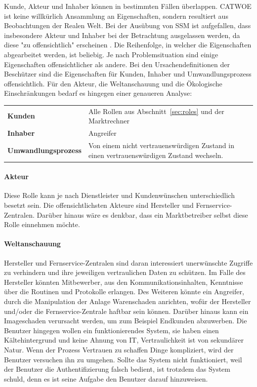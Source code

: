 \documentclass[11pt,a4paper]{report}
\begin{document}
Kunde, Akteur und Inhaber können in bestimmten Fällen überlappen. CATWOE ist keine willkürlich Ansammlung an Eigenschaften, sondern resultiert aus Beobachtungen der Realen Welt. Bei der Ausübung von SSM ist aufgefallen, dass insbesondere Akteur und Inhaber bei der Betrachtung ausgelassen werden, da diese "zu offensichtlich" erscheinen \cite{gutmann7}. Die Reihenfolge, in welcher die Eigenschaften abgearbeitet werden, ist beliebig. Je nach Problemsituation sind einige Eigenschaften offensichtlicher als andere. Bei den Ursachendefinitionen der Beschützer sind die Eigenschaften für Kunden, Inhaber und Umwandlungsprozess offensichtlich. Für den Akteur, die Weltanschauung und die Ökologische Einschränkungen bedarf es hingegen einer genaueren Analyse:

\setlength{\tabcolsep}{12pt}
\renewcommand{\arraystretch}{1.5}
\begin{table}[h] %
\begin{tabularx}{\linewidth}{@{}lX@{}}
\textbf{Kunden} & Alle Rollen aus Abschnitt~\ref{sec:roles} und der Marktrechner\\
\textbf{Inhaber} & Angreifer\\
\textbf{Umwandlungsprozess} & 
Von einem nicht vertrauenswürdigen Zustand in einen vertrauenswürdigen Zustand wechseln.\\
\end{tabularx}
\end{table}

\paragraph{Akteur} Diese Rolle kann je nach Dienstleister und Kundenwünschen unterschiedlich besetzt sein. Die offensichtlichsten Akteure sind Hersteller und Fernservice-Zentralen. Darüber hinaus wäre es denkbar, dass ein Marktbetreiber selbst diese Rolle einnehmen möchte.

\paragraph{Weltanschauung} Hersteller und Fernservice-Zentralen sind daran interessiert unerwünschte Zugriffe zu verhindern und ihre jeweiligen vertraulichen Daten zu schützen. Im Falle des Hersteller könnten Mitbewerber, aus den Kommunikationsinhalten, Kenntnisse über die Routinen und Protokolle erlangen. Des Weiteren könnte ein Angreifer, durch die Manipulation der Anlage Warenschaden anrichten, wofür der Hersteller und/oder die Fernservice-Zentrale haftbar sein können. Darüber hinaus kann ein Imageschaden verursacht werden, um zum Beispiel Endkunden abzuwerben. Die Benutzer hingegen wollen ein funktionierendes System, sie haben einen Kältehintergrund und keine Ahnung von IT, Vertraulichkeit ist von sekundärer Natur. Wenn der Prozess Vertrauen zu schaffen Dinge kompliziert, wird der Benutzer versuchen ihn zu umgehen. Sollte das System nicht funktioniert, weil der Benutzer die Authentifizierung falsch bedient, ist trotzdem das System schuld, denn es ist seine Aufgabe den Benutzer darauf hinzuweisen.
\end{document}
